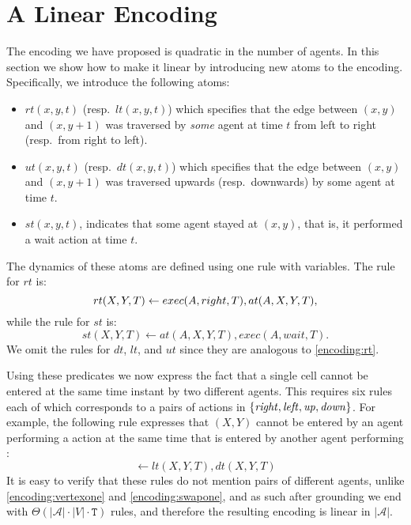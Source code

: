 \section{A Linear Encoding}
The encoding we have proposed is quadratic in the number of agents. In this section we show how to make it linear by introducing new atoms to the encoding. Specifically, we introduce the following atoms:
\begin{itemize}
    \item $rt(x,y,t)$ (resp.\ $lt(x,y,t)$) which specifies that the edge between $(x,y)$ and $(x,y+1)$ was traversed by \emph{some} agent at time $t$ from left to right (resp.\ from right to left).
    \item $ut(x,y,t)$ (resp.\ $dt(x,y,t)$) which specifies that the edge between $(x,y)$ and $(x,y+1)$ was traversed upwards (resp.\ downwards) by some agent at time $t$.
    \item $st(x,y,t)$, indicates that some agent stayed at $(x,y)$, that is, it  performed a wait action at time $t$.
\end{itemize}

The dynamics of these atoms are defined using one rule with variables. The rule for $rt$ is:
\begin{equation}\small\label{encoding:rt}
  rt(X,Y,T) \leftarrow exec(A,right,T), at(A,X,Y,T),
\end{equation}
while the rule for $st$ is:
{\small\begin{equation*}
  st(X,Y,T) \leftarrow at(A,X,Y,T), exec(A,wait,T).
\end{equation*}}
We omit the rules for $dt$, $lt$, and $ut$ since they are analogous to \eqref{encoding:rt}.

Using these predicates we now express the fact that a single cell cannot be entered at the same time instant by two different agents. This requires six rules each of which corresponds to a pairs of actions in $\{\mathit{right},\mathit{left},\mathit{up},\mathit{down}\}$. For example, the following rule expresses that $(X,Y)$ cannot be entered by an agent performing a \Down action at the same time that is entered by another agent performing  \Up:
{\small\begin{equation*}
  \leftarrow lt(X,Y,T), dt(X,Y,T)
\end{equation*}}
It is easy to verify that these rules do not mention pairs of different agents, unlike \eqref{encoding:vertexone} and \eqref{encoding:swapone}, and as such after grounding we end with $\Theta(|\mathcal{A}|\cdot|V|\cdot\mathtt{T})$ rules, and therefore the resulting encoding is linear in $|\mathcal{A}|$.

